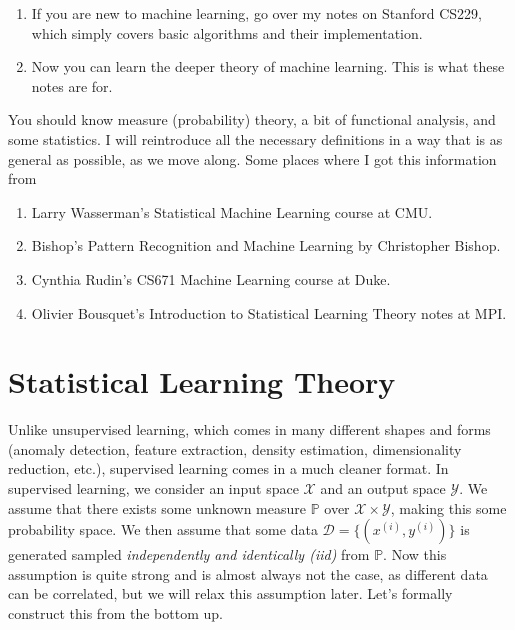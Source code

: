 \documentclass{article}
\begin{document}
\begin{enumerate}
  \item If you are new to machine learning, go over my notes on Stanford CS229, which simply covers basic algorithms and their implementation. 
  \item Now you can learn the deeper theory of machine learning. This is what these notes are for. 
\end{enumerate}
You should know measure (probability) theory, a bit of functional analysis, and some statistics. I will reintroduce all the necessary definitions in a way that is as general as possible, as we move along. Some places where I got this information from  
\begin{enumerate}
  \item Larry Wasserman's Statistical Machine Learning course at CMU. 
  \item Bishop's Pattern Recognition and Machine Learning by Christopher Bishop. 
  \item Cynthia Rudin's CS671 Machine Learning course at Duke. 
  \item Olivier Bousquet's Introduction to Statistical Learning Theory notes at MPI. 
\end{enumerate}


\section{Statistical Learning Theory} 

    Unlike unsupervised learning, which comes in many different shapes and forms (anomaly detection, feature extraction, density estimation, dimensionality reduction, etc.), supervised learning comes in a much cleaner format. In supervised learning, we consider an input space $\mathcal{X}$ and an output space $\mathcal{Y}$. We assume that there exists some unknown measure $\mathbb{P}$ over $\mathcal{X} \times \mathcal{Y}$, making this some probability space. We then assume that some data $\mathcal{D} = \{(x^{(i)}, y^{(i)})\}$ is generated sampled \textit{independently and identically (iid)} from $\mathbb{P}$. Now this assumption is quite strong and is almost always not the case, as different data can be correlated, but we will relax this assumption later. Let's formally construct this from the bottom up. 
\end{document}

